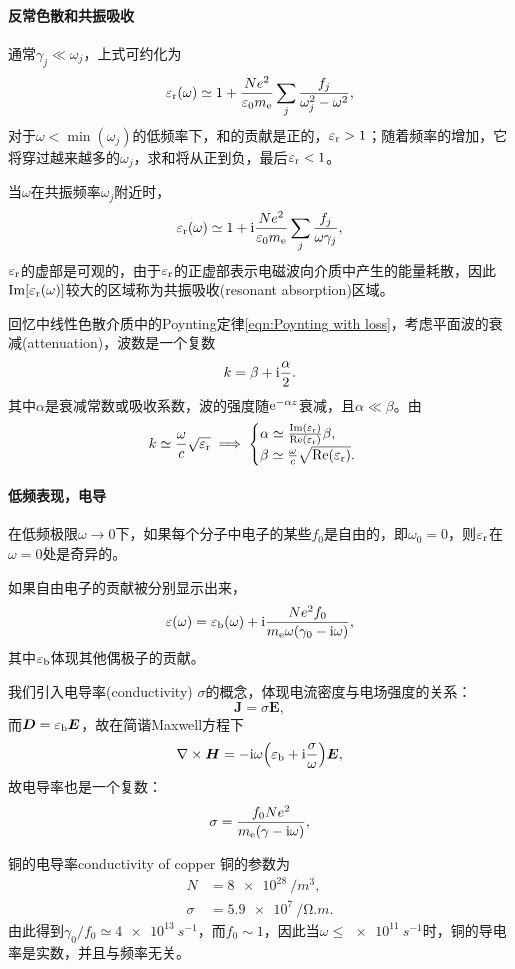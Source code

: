 \paragraph{反常色散和共振吸收}

通常$\gamma_j\ll\omega_j$，上式可约化为
\[
    \varepsilon_\text r(\omega)\simeq 1+\frac{Ne^2}{\varepsilon_0m_\mathrm e}\sum_j\frac{f_j}{\omega_j^2-\omega^2},
\]
对于$\omega<\min(\omega_j)$的低频率下，和的贡献是正的，$\varepsilon_\text r>1$；随着频率的增加，它将穿过越来越多的$\omega_j$，求和将从正到负，最后$\varepsilon_\text r<1$。

当$\omega$在共振频率$\omega_j$附近时，
\[
    \varepsilon_\text r(\omega)\simeq 1+\mathrm{i}\frac{Ne^2}{\varepsilon_0m_\mathrm e}\sum_j\frac{f_j}{\omega\gamma_j},
\]
$\varepsilon_\text r$的虚部是可观的，由于$\varepsilon_\text r$的正虚部表示电磁波向介质中产生的能量耗散，因此$\operatorname{Im}[\varepsilon_\text r(\omega)]$较大的区域称为共振吸收(resonant absorption)区域。

回忆中线性色散介质中的Poynting定律\eqref{eqn:Poynting with loss}，考虑平面波的衰减(attenuation)，波数是一个复数
\[
    k=\beta+\mathrm{i}\frac\alpha 2.
\]
其中$\alpha$是衰减常数或吸收系数，波的强度随$\mathop{}\!\mathrm{e}^{-\alpha z}$衰减，且$\alpha\ll\beta$。由
\[
    k\simeq\frac\omega c\sqrt{\varepsilon_\text r}\implies
    \begin{cases}
        \alpha\simeq\frac{\operatorname{Im}(\varepsilon_\text r)}{\operatorname{Re}(\varepsilon_\text r)}\beta,\\
        \beta\simeq\frac\omega c\sqrt{\operatorname{Re}(\varepsilon_\text r)}.
    \end{cases}
\]
\paragraph{低频表现，电导}
在低频极限$\omega\to0$下，如果每个分子中电子的某些$f_0$是自由的，即$\omega_0=0$，则$\varepsilon_\text r$在$\omega=0$处是奇异的。

如果自由电子的贡献被分别显示出来，
\[
    \varepsilon(\omega)=\varepsilon_\text b(\omega)+\mathrm{i}\frac{Ne^2f_0}{m_\mathrm e\omega(\gamma_0-\mathrm{i}\omega)},
\]
其中$\varepsilon_\text b$体现其他偶极子的贡献。

我们引入电导率(conductivity) $\sigma$的概念，体现电流密度与电场强度的关系：
\[
    \bm J=\sigma\bm E,
\]
而$\bm D=\varepsilon_\text b\bm E$，故在简谐Maxwell方程下
\[
    \nabla\times\bm H=-\mathrm{i}\omega\Bigl(\varepsilon_\text b+\mathrm{i}\frac\sigma\omega\Bigr)\bm E,
\]
故电导率也是一个复数：
\begin{equation}
    \sigma=\frac{f_0Ne^2}{m_\mathrm e(\gamma-\mathrm{i}\omega)},
\end{equation} 
\begin{example}{铜的电导率}{conductivity of copper}
    铜的参数为
    \begin{align*}
        N&=\SI{8e28}{/m^3},\\
        \sigma&=\SI{5.9e7}{/\ohm.m}.
    \end{align*}
    由此得到$\gamma_0/f_0\simeq\SI{4e13}{s^{-1}}$，而$f_0\sim 1$，因此当$\omega\leqslant\SI{e11}{s^{-1}}$时，铜的导电率是实数，并且与频率无关。
\end{example}
